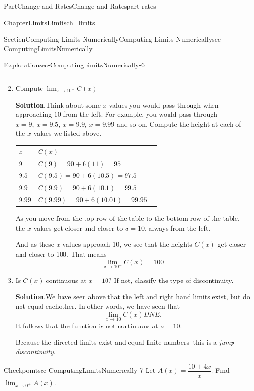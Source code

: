 \documentclass[oneside,10pt,]{tufte-book}
\newcommand{\blocktitlefont}{\relax}
\newcommand{\tabularfont}{\relax}
\numberwithin{equation}{chapter}
\newcommand{\hrulemedium}{\noalign{\hrule height 0.07em}}
\begin{document}
\begin{partptx}{Part}{Change and Rates}{}{Change and Rates}{}{}{part-rates}
\begin{chapterptx}{Chapter}{Limits}{}{Limits}{}{}{ch_limits}
\begin{sectionptx}{Section}{Computing Limits Numerically}{}{Computing Limits Numerically}{}{}{sec-ComputingLimitsNumerically}
\begin{exploration}{Exploration}{}{sec-ComputingLimitsNumerically-6}
\begin{enumerate}[font=\bfseries,label=(\alph*),ref=\alph*]
\begin{equation*}
\end{equation*}
%
\item{}Compute \(\displaystyle \lim_{x\rightarrow 10^-} C(x)\)%
\par\smallskip%
\noindent\textbf{\blocktitlefont Solution}.\hypertarget{sec-ComputingLimitsNumerically-6-3-2}{}\quad{}Think about some \(x\) values you would pass through when approaching \(10\) from the left. For example, you would pass through \(x=9,\ x=9.5,\ x=9.9,\ x=9.99\) and so on. Compute the height at each of the \(x\) values we listed above. \begin{center}%
{\tabularfont%
\begin{tabular}{lBl}
\(x\)&\(C(x)\)\tabularnewline\hrulemedium
\(9\)&\(C(9) =  90 + 6(11) = 95  \)\tabularnewline\hrulemedium
\(9.5\)&\(C(9.5) = 90 + 6(10.5) = 97.5  \)\tabularnewline\hrulemedium
\(9.9\)&\(C(9.9) =  90 + 6(10.1) =99.5  \)\tabularnewline\hrulemedium
\(9.99\)&\(C(9.99) = 90 + 6(10.01) = 99.95\)
\end{tabular}
}%
\end{center}%
 As you move from the top row of the table to the bottom row of the table, the \(x\) values get closer and closer to \(a=10\), always from the left.%
\par
And as these \(x\) values approach 10, we see that the heights \(C(x)\) get closer and closer to 100.  That means%
\begin{equation*}
\lim_{x\rightarrow 10^-} C(x) = 100
\end{equation*}
%
\item{}Is \(C(x)\) continuous at \(x=10\)?  If not, classify the type of discontinuity.%
\par\smallskip%
\noindent\textbf{\blocktitlefont Solution}.\hypertarget{sec-ComputingLimitsNumerically-6-4-2}{}\quad{}We have seen above that the left and right hand limits exist, but do not equal eachother.  In other words, we have seen that%
\begin{equation*}
\lim_{x\rightarrow 10} C(x) DNE\text{.}
\end{equation*}
It follows that the function is not continuous at \(a=10\).%
\par
Because the directed limits exist and equal finite numbers, this is a \emph{jump discontinuity}.%
\end{enumerate}%
\end{exploration}%
\begin{inlineexercise}{Checkpoint}{}{sec-ComputingLimitsNumerically-7}%
Let \(A(x) = \dfrac{10+4x}{x}\). Find \(\displaystyle\lim_{x\rightarrow 0^+} A(x)\).%

\end{inlineexercise}
\end{sectionptx}
\end{chapterptx}
\end{partptx}
\end{document}
